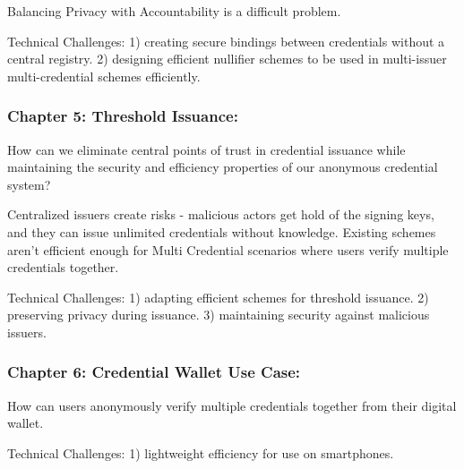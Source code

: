 Balancing Privacy with Accountability is a difficult problem.

Technical Challenges: 1) creating secure bindings between credentials without a central registry. 2) designing efficient nullifier schemes to be used in multi-issuer multi-credential schemes efficiently.


\subsubsection*{Chapter 5: Threshold Issuance: } 
How can we eliminate central points of trust in credential issuance while maintaining the security and efficiency properties of our anonymous credential system?

Centralized issuers create risks - malicious actors get hold of the signing keys, and they can issue unlimited credentials without knowledge. Existing schemes aren't efficient enough for Multi Credential scenarios where users verify multiple credentials together.

Technical Challenges: 1) adapting efficient schemes for threshold issuance. 2) preserving privacy during issuance. 3) maintaining security against malicious issuers. 



\subsubsection*{Chapter 6: Credential Wallet Use Case: } 
How can users anonymously verify multiple credentials together from their digital wallet.


Technical Challenges: 1) lightweight efficiency for use on smartphones. 





